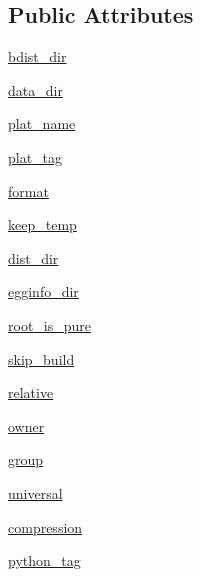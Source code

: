 \subsection*{Public Attributes}
\begin{DoxyCompactItemize}
\item 
\hyperlink{classwheel_1_1bdist__wheel_1_1bdist__wheel_a67064f9cc30fd092e58825cce247a6a0}{bdist\+\_\+dir}
\item 
\hyperlink{classwheel_1_1bdist__wheel_1_1bdist__wheel_abea0432cf269389592b43a89b24e686f}{data\+\_\+dir}
\item 
\hyperlink{classwheel_1_1bdist__wheel_1_1bdist__wheel_add1548a5bfa6cdb1b00a9919775fe848}{plat\+\_\+name}
\item 
\hyperlink{classwheel_1_1bdist__wheel_1_1bdist__wheel_a7592f3ff16c020b6ee80fd5e4a7e19da}{plat\+\_\+tag}
\item 
\hyperlink{classwheel_1_1bdist__wheel_1_1bdist__wheel_aac6fd89fb3c5a55d53af887a55813e17}{format}
\item 
\hyperlink{classwheel_1_1bdist__wheel_1_1bdist__wheel_adf5fd182a2a50a82d6a4124d7be2e2e6}{keep\+\_\+temp}
\item 
\hyperlink{classwheel_1_1bdist__wheel_1_1bdist__wheel_a0a8c534255e96c8aae20d140acbef43b}{dist\+\_\+dir}
\item 
\hyperlink{classwheel_1_1bdist__wheel_1_1bdist__wheel_aa76e6d2f9fe4b0f382eda1e903e11fa3}{egginfo\+\_\+dir}
\item 
\hyperlink{classwheel_1_1bdist__wheel_1_1bdist__wheel_a9877e7e9821397223333e677331543a3}{root\+\_\+is\+\_\+pure}
\item 
\hyperlink{classwheel_1_1bdist__wheel_1_1bdist__wheel_a3dbe63729647ec7fd255e983e311aca0}{skip\+\_\+build}
\item 
\hyperlink{classwheel_1_1bdist__wheel_1_1bdist__wheel_a509f2afce917794a2f9378cb7c85d47c}{relative}
\item 
\hyperlink{classwheel_1_1bdist__wheel_1_1bdist__wheel_a437e0bf48a7829220263653c0de71543}{owner}
\item 
\hyperlink{classwheel_1_1bdist__wheel_1_1bdist__wheel_aebdad3cfb43973aa9761dd89b8e34105}{group}
\item 
\hyperlink{classwheel_1_1bdist__wheel_1_1bdist__wheel_aee6bc639a672dfce803aaef4e8eeca3a}{universal}
\item 
\hyperlink{classwheel_1_1bdist__wheel_1_1bdist__wheel_ac72ab1f328d5e7f45ae4e6a384d80e6e}{compression}
\item 
\hyperlink{classwheel_1_1bdist__wheel_1_1bdist__wheel_a0aeb0e68b0e98524395b7d0981856abc}{python\+\_\+tag}

\end{DoxyCompactItemize}
